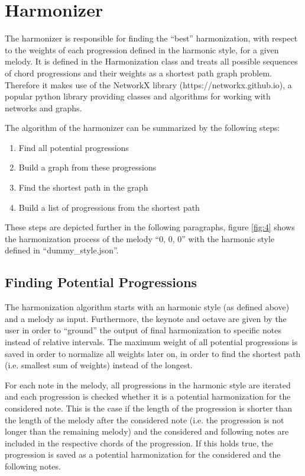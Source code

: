 \section{Harmonizer}
The harmonizer is responsible for finding the ``best'' harmonization, with respect to the weights of each progression defined in the harmonic style, for a given melody. It is defined in the Harmonization class and treats all possible sequences of chord progressions and their weights as a shortest path graph problem. Therefore it makes use of the NetworkX library (https://networkx.github.io), a popular python library providing classes and algorithms for working with networks and graphs. 

The algorithm of the harmonizer can be summarized by the following steps:
\begin{enumerate}
  \item Find all potential progressions
  \item Build a graph from these progressions
  \item Find the shortest path in the graph
  \item Build a list of progressions from the shortest path
\end{enumerate}
These steps are depicted further in the following paragraphs, figure \ref{fig:4} shows the harmonization process of the melody ``0, 0, 0'' with the harmonic style defined in ``dummy\_style.json''.

\subsection{Finding Potential Progressions}
The harmonization algorithm starts with an harmonic style (as defined above) and a melody as input. Furthermore, the keynote and octave are given by the user in order to ``ground'' the output of final harmonization to specific notes instead of relative intervals. The maximum weight of all potential progressions is saved in order to normalize all weights later on, in order to find the shortest path (i.e. smallest sum of weights) instead of the longest.

For each note in the melody, all progressions in the harmonic style are iterated and each progression is checked whether it is a potential harmonization for the considered note. This is the case if the length of the progression is shorter than the length of the melody after the considered note (i.e. the progression is not longer than the remaining melody) and the considered and following notes are included in the respective chords of the progression. If this holds true, the progression is saved as a potential harmonization for the considered and the following notes.

